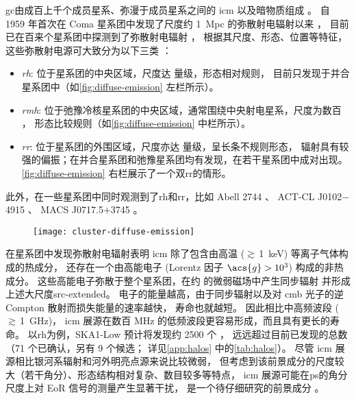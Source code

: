 \ac{gc}由成百上千个成员星系、弥漫于成员星系之间的 \ac{icm} 以及暗物质组成
\cite{sarazin1986,bohringer2010}。
自 1959 年首次在 Coma 星系团中发现了尺度约 \SI{1}{Mpc} 的弥散射电辐射以来
\cite{large1959}，
目前已在百来个星系团中探测到了弥散射电辐射 \cite{feretti2012,vanWeeren2019}，
根据其尺度、形态、位置等特征，这些弥散射电源可大致分为以下三类
\cite{feretti2012,kale2016}：
\begin{itemize}
  \item \emph{\acf{rh}}:
    位于星系团的中央区域，尺度达 \si{\Mpc} 量级，形态相对规则，
    目前只发现于并合星系团中（如\autoref{fig:diffuse-emission} 左栏所示）。
  \item \emph{\acf{rmh}}:
    位于弛豫冷核星系团的中央区域，通常围绕中央射电星系，尺度为数百 \si{\kpc}，
    形态比较规则（如\autoref{fig:diffuse-emission} 中栏所示）。
  \item \emph{\acf{rr}}:
    位于星系团的外围区域，尺度亦达 \si{\Mpc} 量级，呈长条不规则形态，
    辐射具有较强的偏振；在并合星系团和弛豫星系团均有发现，在若干星系团中成对出现。
    \autoref{fig:diffuse-emission} 右栏展示了一个双\ac{rr}的情形。
\end{itemize}
此外，在一些星系团中同时观测到了\ac{rh}和\ac{rr}，比如
Abell 2744 \cite{govoni2001}、
ACT-CL J0102$-$4915 \cite{lindner2014}、
MACS J0717.5$+$3745 \cite{vanWeeren2009}。

\begin{figure}[htp]
  \centering
  \texttt{[image: cluster-diffuse-emission]}
  \label{fig:diffuse-emission}
\end{figure}

在星系团中发现弥散射电辐射表明
\ac{icm} 除了包含由高温 ($\gtrsim$\,\SI{1}{\keV}) 等离子气体构成的热成分，
还存在一个由高能电子 (Lorentz 因子 $\acs{g} > \num{e3}$) 构成的非热成分。
这些高能电子弥散于整个星系团，在约 \si{\uG} 的微弱磁场中产生同步辐射
并形成上述大尺度\ac{src-extended}。
电子的能量越高，由于同步辐射以及对 \ac{cmb} 光子的逆 Compton 散射而损失能量的速率越快，
寿命也就越短。
因此相比中高频波段 ($\gtrsim$\,\SI{1}{\GHz})，
\ac{icm} 展源在数百 MHz 的低频波段更容易形成，而且具有更长的寿命。
以\ac{rh}为例，SKA1-Low 预计将发现约 2500 个 \cite{cassano2015}，
远远超过目前已发现的总数（71 个已确认，另有 9 个候选；
详见\autoref{app:halos} 中的\autoref{tab:halos}）。
尽管 \ac{icm} 展源相比银河系辐射和河外明亮点源来说比较微弱，
但考虑到该前景成分的尺度较大（若干角分）、形态结构相对复杂、数目较多等特点，
\ac{icm} 展源可能在\ac{ps}的角分尺度上对 EoR 信号的测量产生显著干扰，
是一个待仔细研究的前景成分 \cite{diMatteo2004,gleser2008}。

